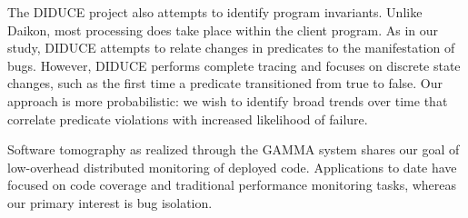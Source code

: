 The DIDUCE project \cite{Hangal:DIDUCE:2002} also attempts to identify
program invariants.  Unlike Daikon, most processing does take place
within the client program.  As in our study, DIDUCE attempts to relate
changes in predicates to the manifestation of bugs.  However, DIDUCE
performs complete tracing and focuses on discrete state changes, such
as the first time a predicate transitioned from true to false.  Our
approach is more probabilistic: we wish to identify broad trends over
time that correlate predicate violations with increased likelihood of
failure.  

Software tomography as realized through the GAMMA system
\cite{PASTE'02*2} shares our goal of low-overhead distributed
monitoring of deployed code.  Applications to date have focused on
code coverage and traditional performance monitoring tasks, whereas
our primary interest is bug isolation.  

